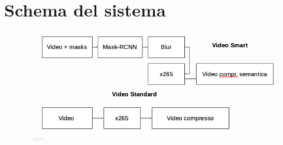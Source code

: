 \section{Schema del sistema}
\begin{figure}
   \includegraphics[width=\linewidth]{images/schema.png}
   \caption{}
   \label{fig:c}
\end{figure}
